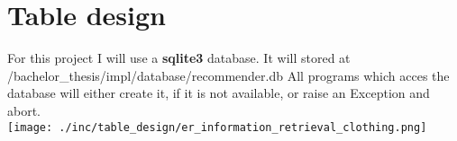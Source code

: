 

\section{Table design}
For this project I will use a \textbf{sqlite3} database.
It will stored at /bachelor\_thesis/impl/database/recommender.db
All programs which acces the database will either create it, if it is not available, or raise an Exception and abort.\\

\bigskip
\texttt{[image: ./inc/table\_design/er\_information\_retrieval\_clothing.png]}

\bigskip
{}

\bigskip



